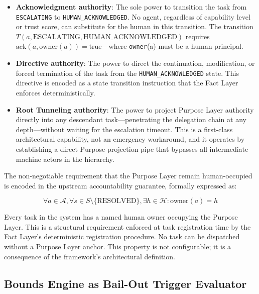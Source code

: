 \begin{itemize}
\item \textbf{Acknowledgment authority}: The sole power to transition the task from \texttt{ESCALATING} to \texttt{HUMAN\_ACKNOWLEDGED}. No agent, regardless of capability level or trust score, can substitute for the human in this transition. The transition $T(a, \text{ESCALATING}, \text{HUMAN\_ACKNOWLEDGED})$ requires $\text{ack}(a, \text{owner}(a)) = \text{true}$---where \texttt{owner}(a) must be a human principal.

\item \textbf{Directive authority}: The power to direct the continuation, modification, or forced termination of the task from the \texttt{HUMAN\_ACKNOWLEDGED} state. This directive is encoded as a state transition instruction that the Fact Layer enforces deterministically.

\item \textbf{Root Tunneling authority}: The power to project Purpose Layer authority directly into any descendant task---penetrating the delegation chain at any depth---without waiting for the escalation timeout. This is a first-class architectural capability, not an emergency workaround, and it operates by establishing a direct Purpose-projection pipe that bypasses all intermediate machine actors in the hierarchy.
\end{itemize}

The non-negotiable requirement that the Purpose Layer remain human-occupied is encoded in the upstream accountability guarantee, formally expressed as:

\begin{equation}
\forall a \in \mathcal{A}, \forall s \in S \setminus \{\text{RESOLVED}\}, \exists h \in \mathcal{H} : \text{owner}(a) = h
\tag{G-Purpose}
\end{equation}

Every task in the system has a named human owner occupying the Purpose Layer. This is a structural requirement enforced at task registration time by the Fact Layer's deterministic registration procedure. No task can be dispatched without a Purpose Layer anchor. This property is not configurable; it is a consequence of the framework's architectural definition.

\subsection{Bounds Engine as Bail-Out Trigger Evaluator}
\label{sec:bounds-trigger}

